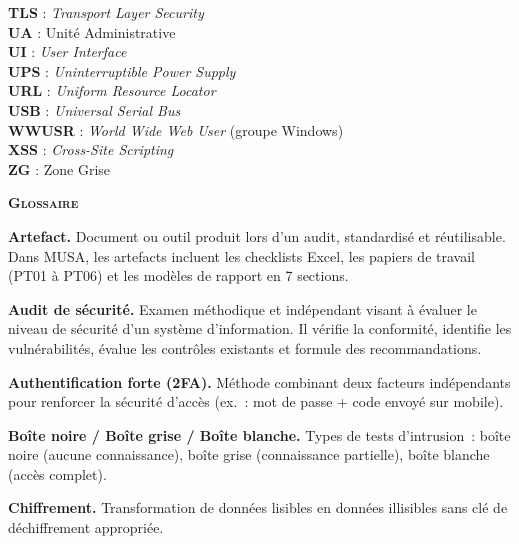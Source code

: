 \documentclass[12pt,a4paper,oneside]{report}
\begin{document}
\textbf{TLS} : \textit{Transport Layer Security}\\[2pt]
\textbf{UA} : Unité Administrative\\[2pt]
\textbf{UI} : \textit{User Interface}\\[2pt]
\textbf{UPS} : \textit{Uninterruptible Power Supply}\\[2pt]
\textbf{URL} : \textit{Uniform Resource Locator}\\[2pt]
\textbf{USB} : \textit{Universal Serial Bus}\\[2pt]
\textbf{WWUSR} : \textit{World Wide Web User} (groupe Windows)\\[2pt]
\textbf{XSS} : \textit{Cross-Site Scripting}\\[2pt]
\textbf{ZG} : Zone Grise
\par
\newpage
\thispagestyle{plain}
\begin{flushright}
	{\Huge\bfseries\scshape\color{navy} Glossaire}
\end{flushright}
\vspace{0.2cm}
\vspace{0.8cm}

\noindent
\textbf{Artefact.} Document ou outil produit lors d'un audit, standardisé et réutilisable. Dans MUSA, les artefacts incluent les checklists Excel, les papiers de travail (PT01 à PT06) et les modèles de rapport en 7 sections.

\smallskip\noindent
\textbf{Audit de sécurité.} Examen méthodique et indépendant visant à évaluer le niveau de sécurité d'un système d'information. Il vérifie la conformité, identifie les vulnérabilités, évalue les contrôles existants et formule des recommandations.

\smallskip\noindent
\textbf{Authentification forte (2FA).} Méthode combinant deux facteurs indépendants pour renforcer la sécurité d'accès (ex.~: mot de passe + code envoyé sur mobile).

\smallskip\noindent
\textbf{Boîte noire / Boîte grise / Boîte blanche.} Types de tests d'intrusion~: boîte noire (aucune connaissance), boîte grise (connaissance partielle), boîte blanche (accès complet).

\smallskip\noindent
\textbf{Chiffrement.} Transformation de données lisibles en données illisibles sans clé de déchiffrement appropriée.
\end{document}
